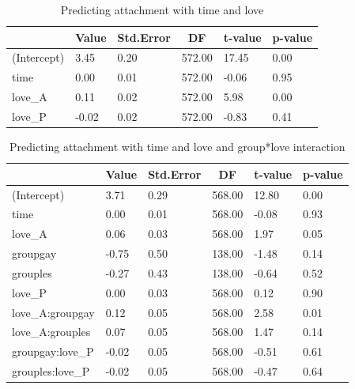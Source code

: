\documentclass[man]{apa6}
\begin{document}
\begin{table}[tbp]

\begin{center}
\begin{threeparttable}

\caption{\label{tab:unnamed-chunk-17}Predicting attachment with time and love}

\begin{tabular}{llllll}
\toprule
 & \multicolumn{1}{c}{Value} & \multicolumn{1}{c}{Std.Error} & \multicolumn{1}{c}{DF} & \multicolumn{1}{c}{t-value} & \multicolumn{1}{c}{p-value}\\
\midrule
(Intercept) & 3.45 & 0.20 & 572.00 & 17.45 & 0.00\\
time & 0.00 & 0.01 & 572.00 & -0.06 & 0.95\\
love\_A & 0.11 & 0.02 & 572.00 & 5.98 & 0.00\\
love\_P & -0.02 & 0.02 & 572.00 & -0.83 & 0.41\\
\bottomrule
\end{tabular}

\end{threeparttable}
\end{center}

\end{table}

\begin{table}[tbp]

\begin{center}
\begin{threeparttable}

\caption{\label{tab:unnamed-chunk-18}Predicting attachment with time and love and group*love interaction}

\begin{tabular}{llllll}
\toprule
 & \multicolumn{1}{c}{Value} & \multicolumn{1}{c}{Std.Error} & \multicolumn{1}{c}{DF} & \multicolumn{1}{c}{t-value} & \multicolumn{1}{c}{p-value}\\
\midrule
(Intercept) & 3.71 & 0.29 & 568.00 & 12.80 & 0.00\\
time & 0.00 & 0.01 & 568.00 & -0.08 & 0.93\\
love\_A & 0.06 & 0.03 & 568.00 & 1.97 & 0.05\\
groupgay & -0.75 & 0.50 & 138.00 & -1.48 & 0.14\\
grouples & -0.27 & 0.43 & 138.00 & -0.64 & 0.52\\
love\_P & 0.00 & 0.03 & 568.00 & 0.12 & 0.90\\
love\_A:groupgay & 0.12 & 0.05 & 568.00 & 2.58 & 0.01\\
love\_A:grouples & 0.07 & 0.05 & 568.00 & 1.47 & 0.14\\
groupgay:love\_P & -0.02 & 0.05 & 568.00 & -0.51 & 0.61\\
grouples:love\_P & -0.02 & 0.05 & 568.00 & -0.47 & 0.64\\
\bottomrule
\end{tabular}

\end{threeparttable}
\end{center}

\end{table}
\end{document}
